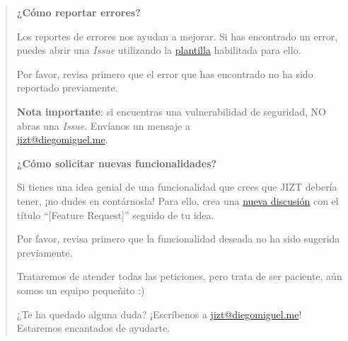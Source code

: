 \begin{quote}
	\medskip
	\textbf{¿Cómo reportar errores?}
	
	Los reportes de errores nos ayudan a mejorar. Si has encontrado un error,
	puedes abrir una \emph{Issue} utilizando la
	\href{https://github.com/dmlls/jizt-tfg/issues/new?assignees=&labels=bug&template=reportar-error.md\&title=}{plantilla}	habilitada para ello.
	
	Por favor, revisa primero que el error que has encontrado no ha sido
	reportado previamente.
	
	\smallskip
	\textbf{Nota importante}: si encuentras una vulnerabilidad de seguridad, NO
	abras una \emph{Issue}. Envíanos un mensaje a \\ \href{mailto:jizt@diegomiguel.me}{jizt@diegomiguel.me}.
	
	\medskip
	\textbf{¿Cómo solicitar nuevas funcionalidades?}
	
	Si tienes una idea genial de una funcionalidad que crees que JIZT debería tener, ¡no dudes en contárnosla! Para ello, crea una \href{https://github.com/dmlls/jizt-tfg/discussions/new}{nueva discusión} con el título ``[Feature Request]'' seguido de tu idea.
	
	Por favor, revisa primero que la funcionalidad deseada no ha sido sugerida
	previamente.
	
	Trataremos de atender todas las peticiones, pero trata de ser paciente,
	aún somos un equipo pequeñito :)
	
	¿Te ha quedado alguna duda? ¡Escríbenos a
	\href{mailto:jizt@diegomiguel.me}{jizt@diegomiguel.me}! Estaremos encantados de	ayudarte.
\end{quote}